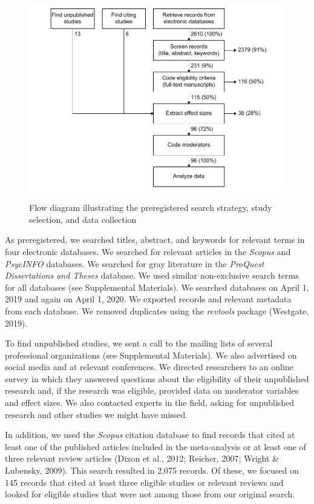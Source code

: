 \documentclass[twocolumn, 11pt, letterpaper]{article}
\begin{document}
\begin{figure}[!t]
\centering
\caption{Flow diagram illustrating the preregistered search strategy, study selection, and data collection}
\includegraphics[scale=1]{../figures/figure-1}
\label{fig:f1}
\end{figure}

As preregistered, we searched titles, abstract, and keywords for
relevant terms in four electronic databases. We searched for relevant
articles in the \emph{Scopus} and \emph{PsycINFO} databases. We searched
for gray literature in the \emph{ProQuest Dissertations and Theses}
database. We used similar non-exclusive search terms for all databases
(see Supplemental Materials). We searched databases on April 1, 2019 and
again on April 1, 2020. We exported records and relevant metadata from
each database. We removed duplicates using the \emph{revtools} package
(Westgate, 2019).

To find unpublished studies, we sent a call to the mailing lists of
several professional organizations (see Supplemental Materials). We also
advertised on social media and at relevant conferences. We directed
researchers to an online survey in which they answered questions about
the eligibility of their unpublished research and, if the research was
eligible, provided data on moderator variables and effect sizes. We also
contacted experts in the field, asking for unpublished research and
other studies we might have missed.

In addition, we used the \emph{Scopus} citation database to find records
that cited at least one of the published articles included in the
meta-analysis or at least one of three relevant review articles (Dixon
et al., 2012; Reicher, 2007; Wright \& Lubensky, 2009). This search
resulted in 2,075 records. Of these, we focused on 145 records that
cited at least three eligible studies or relevant reviews and looked for
eligible studies that were not among those from our original search.
\end{document}

